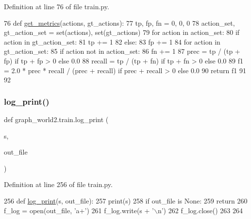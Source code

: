 Definition at line 76 of file train.\+py.


\begin{DoxyCode}
76 \textcolor{keyword}{def }\hyperlink{namespacegraph__world2_1_1train_ab3ba8ae63848a00ac638b31329041f6b}{get\_metrics}(actions, gt\_actions):
77     tp, fp, fn = 0, 0, 0
78     action\_set, gt\_action\_set = set(actions), set(gt\_actions)
79     \textcolor{keywordflow}{for} action \textcolor{keywordflow}{in} action\_set:
80         \textcolor{keywordflow}{if} action \textcolor{keywordflow}{in} gt\_action\_set:
81             tp += 1
82         \textcolor{keywordflow}{else}:
83             fp += 1
84     \textcolor{keywordflow}{for} action \textcolor{keywordflow}{in} gt\_action\_set:
85         \textcolor{keywordflow}{if} action \textcolor{keywordflow}{not} \textcolor{keywordflow}{in} action\_set:
86             fn += 1
87     prec = tp / (tp + fp) \textcolor{keywordflow}{if} tp + fp > 0 \textcolor{keywordflow}{else} 0.0
88     recall = tp / (tp + fn) \textcolor{keywordflow}{if} tp + fn > 0 \textcolor{keywordflow}{else} 0.0
89     f1 = 2.0 * prec * recall / (prec + recall) \textcolor{keywordflow}{if} prec + recall > 0 \textcolor{keywordflow}{else} 0.0
90     \textcolor{keywordflow}{return} f1
91 
92 
\end{DoxyCode}
\mbox{\label{namespacegraph__world2_1_1train_a145007eac2c8c1c128ec06f4477c943e}} 
\subsubsection{\texorpdfstring{log\+\_\+print()}{log\_print()}}
{\footnotesize\ttfamily def graph\+\_\+world2.\+train.\+log\+\_\+print (\begin{DoxyParamCaption}\item[{}]{s,  }\item[{}]{out\+\_\+file }\end{DoxyParamCaption})}



Definition at line 256 of file train.\+py.


\begin{DoxyCode}
256 \textcolor{keyword}{def }\hyperlink{namespacegraph__world2_1_1train_a145007eac2c8c1c128ec06f4477c943e}{log\_print}(s, out\_file):
257     print(s)
258     \textcolor{keywordflow}{if} out\_file \textcolor{keywordflow}{is} \textcolor{keywordtype}{None}:
259         \textcolor{keywordflow}{return}
260     f\_log = open(out\_file, \textcolor{stringliteral}{'a+'})
261     f\_log.write(s + \textcolor{stringliteral}{'\(\backslash\)n'})
262     f\_log.close()
263 
264 
\end{DoxyCode}
\mbox{\label{namespacegraph__world2_1_1train_af3dec887619817c1a7a38930ffcfd1cb}} 
